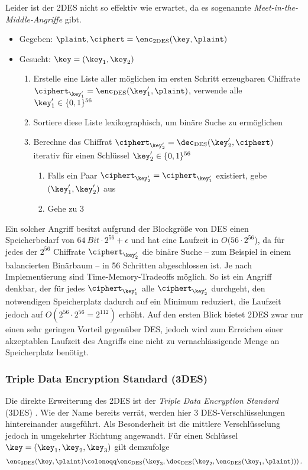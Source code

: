 Leider ist der 2DES nicht so effektiv wie erwartet, da es sogenannte \emph{Meet-in-the-Middle-Angriffe} gibt.
\begin{itemize}
	\item Gegeben: $\plaint, \ciphert = \enc_{\textnormal{2DES}}(\key, \plaint)$
	\item Gesucht: $\key = (\key_{1},\key_{2})$
	\begin{enumerate}
		\item Erstelle eine Liste aller möglichen im ersten Schritt erzeugbaren Chiffrate $\ciphert_{\key'_{1}} = \enc_{\textnormal{DES}}(\key'_{1}, \plaint)$, \dh verwende alle $\key'_{1} \in \{0,1\}^{56}$
		\item Sortiere diese Liste lexikographisch, um binäre Suche zu ermöglichen
		\item Berechne das Chiffrat $\ciphert_{\key'_{2}} = \dec_{\textnormal{DES}}(\key'_{2}, \ciphert)$ iterativ für einen Schlüssel $\key'_{2} \in \{0,1\}^{56}$
		\begin{enumerate}
			\item Falls ein Paar $\ciphert_{\key'_2} = \ciphert_{\key'_{1}}$ existiert, gebe $(\key'_{1},\key'_{2})$ aus
			\item Gehe zu 3
		\end{enumerate}
	\end{enumerate}
\end{itemize}

Ein solcher Angriff besitzt aufgrund der Blockgröße von DES einen Speicherbedarf von $64\ Bit \cdot 2^{56} + \epsilon$ und hat eine Laufzeit in $O(56 \cdot 2^{56}$), da für jedes der $2^{56}$ Chiffrate $\ciphert_{\key'_2}$ die binäre Suche -- zum Beispiel in einem balancierten Binärbaum -- in 56 Schritten abgeschlossen ist. Je nach Implementierung sind Time-Memory-Tradeoffs möglich. So ist ein Angriff denkbar, der für jedes $\ciphert_{\key'_1}$ alle $\ciphert_{\key'_2}$ durchgeht, den notwendigen Speicherplatz dadurch auf ein Minimum reduziert, die Laufzeit jedoch auf $O(2^{56} \cdot 2^{56} = 2^{112})$ erhöht. Auf den ersten Blick bietet 2DES zwar nur einen sehr geringen Vorteil gegenüber DES, jedoch wird zum Erreichen einer akzeptablen Laufzeit des Angriffs eine nicht zu vernachlässigende Menge an Speicherplatz benötigt.

\subsubsection{Triple Data Encryption Standard (3DES)}
\label{sssec:3des}
Die direkte Erweiterung des 2DES ist der \emph{Triple Data Encryption Standard} (3DES) \cite{NIST_TDEA2012}. Wie der Name bereits verrät, werden hier 3 DES-Verschlüsselungen hintereinander ausgeführt. Als Besonderheit ist die mittlere Verschlüsselung jedoch in umgekehrter Richtung angewandt. Für einen Schlüssel $\key = (\key_{1}, \key_{2}, \key_{3})$ gilt demzufolge
\begin{align*}
	\enc_{\textnormal{3DES}}(\key, \plaint) \coloneqq \enc_{\textnormal{DES}}(\key_{3}, \dec_{\textnormal{DES}}(\key_{2}, \enc_{\textnormal{DES}}(\key_{1}, \plaint)))\, .
\end{align*}

